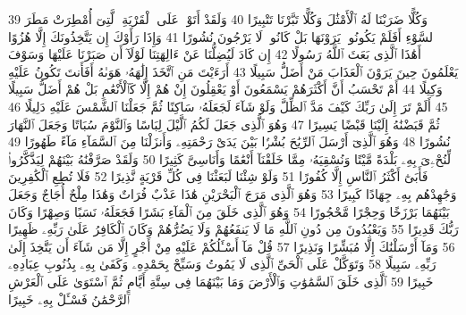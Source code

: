 {\tiny\colorbox{cl_aya}{39}} وَكُلًّا ضَرَبْنَا لَهُ ٱلْأَمْثَٰلَ وَكُلًّا تَبَّرْنَا تَتْبِيرًا
{\tiny\colorbox{cl_aya}{40}} وَلَقَدْ أَتَوْا۟ عَلَى ٱلْقَرْيَةِ ٱلَّتِىٓ أُمْطِرَتْ مَطَرَ ٱلسَّوْءِ أَفَلَمْ يَكُونُوا۟ يَرَوْنَهَا بَلْ كَانُوا۟ لَا يَرْجُونَ نُشُورًا
{\tiny\colorbox{cl_aya}{41}} وَإِذَا رَأَوْكَ إِن يَتَّخِذُونَكَ إِلَّا هُزُوًا أَهَٰذَا ٱلَّذِى بَعَثَ ٱللَّهُ رَسُولًا
{\tiny\colorbox{cl_aya}{42}} إِن كَادَ لَيُضِلُّنَا عَنْ ءَالِهَتِنَا لَوْلَآ أَن صَبَرْنَا عَلَيْهَا وَسَوْفَ يَعْلَمُونَ حِينَ يَرَوْنَ ٱلْعَذَابَ مَنْ أَضَلُّ سَبِيلًا
{\tiny\colorbox{cl_aya}{43}} أَرَءَيْتَ مَنِ ٱتَّخَذَ إِلَٰهَهُۥ هَوَىٰهُ أَفَأَنتَ تَكُونُ عَلَيْهِ وَكِيلًا
{\tiny\colorbox{cl_aya}{44}} أَمْ تَحْسَبُ أَنَّ أَكْثَرَهُمْ يَسْمَعُونَ أَوْ يَعْقِلُونَ إِنْ هُمْ إِلَّا كَٱلْأَنْعَٰمِ بَلْ هُمْ أَضَلُّ سَبِيلًا
{\tiny\colorbox{cl_aya}{45}} أَلَمْ تَرَ إِلَىٰ رَبِّكَ كَيْفَ مَدَّ ٱلظِّلَّ وَلَوْ شَآءَ لَجَعَلَهُۥ سَاكِنًا ثُمَّ جَعَلْنَا ٱلشَّمْسَ عَلَيْهِ دَلِيلًا
{\tiny\colorbox{cl_aya}{46}} ثُمَّ قَبَضْنَٰهُ إِلَيْنَا قَبْضًا يَسِيرًا
{\tiny\colorbox{cl_aya}{47}} وَهُوَ ٱلَّذِى جَعَلَ لَكُمُ ٱلَّيْلَ لِبَاسًا وَٱلنَّوْمَ سُبَاتًا وَجَعَلَ ٱلنَّهَارَ نُشُورًا
{\tiny\colorbox{cl_aya}{48}} وَهُوَ ٱلَّذِىٓ أَرْسَلَ ٱلرِّيَٰحَ بُشْرًۢا بَيْنَ يَدَىْ رَحْمَتِهِۦ وَأَنزَلْنَا مِنَ ٱلسَّمَآءِ مَآءً طَهُورًا
{\tiny\colorbox{cl_aya}{49}} لِّنُحْۦِىَ بِهِۦ بَلْدَةً مَّيْتًا وَنُسْقِيَهُۥ مِمَّا خَلَقْنَآ أَنْعَٰمًا وَأَنَاسِىَّ كَثِيرًا
{\tiny\colorbox{cl_aya}{50}} وَلَقَدْ صَرَّفْنَٰهُ بَيْنَهُمْ لِيَذَّكَّرُوا۟ فَأَبَىٰٓ أَكْثَرُ ٱلنَّاسِ إِلَّا كُفُورًا
{\tiny\colorbox{cl_aya}{51}} وَلَوْ شِئْنَا لَبَعَثْنَا فِى كُلِّ قَرْيَةٍ نَّذِيرًا
{\tiny\colorbox{cl_aya}{52}} فَلَا تُطِعِ ٱلْكَٰفِرِينَ وَجَٰهِدْهُم بِهِۦ جِهَادًا كَبِيرًا
{\tiny\colorbox{cl_aya}{53}} وَهُوَ ٱلَّذِى مَرَجَ ٱلْبَحْرَيْنِ هَٰذَا عَذْبٌ فُرَاتٌ وَهَٰذَا مِلْحٌ أُجَاجٌ وَجَعَلَ بَيْنَهُمَا بَرْزَخًا وَحِجْرًا مَّحْجُورًا
{\tiny\colorbox{cl_aya}{54}} وَهُوَ ٱلَّذِى خَلَقَ مِنَ ٱلْمَآءِ بَشَرًا فَجَعَلَهُۥ نَسَبًا وَصِهْرًا وَكَانَ رَبُّكَ قَدِيرًا
{\tiny\colorbox{cl_aya}{55}} وَيَعْبُدُونَ مِن دُونِ ٱللَّهِ مَا لَا يَنفَعُهُمْ وَلَا يَضُرُّهُمْ وَكَانَ ٱلْكَافِرُ عَلَىٰ رَبِّهِۦ ظَهِيرًا
{\tiny\colorbox{cl_aya}{56}} وَمَآ أَرْسَلْنَٰكَ إِلَّا مُبَشِّرًا وَنَذِيرًا
{\tiny\colorbox{cl_aya}{57}} قُلْ مَآ أَسْـَٔلُكُمْ عَلَيْهِ مِنْ أَجْرٍ إِلَّا مَن شَآءَ أَن يَتَّخِذَ إِلَىٰ رَبِّهِۦ سَبِيلًا
{\tiny\colorbox{cl_aya}{58}} وَتَوَكَّلْ عَلَى ٱلْحَىِّ ٱلَّذِى لَا يَمُوتُ وَسَبِّحْ بِحَمْدِهِۦ وَكَفَىٰ بِهِۦ بِذُنُوبِ عِبَادِهِۦ خَبِيرًا
{\tiny\colorbox{cl_aya}{59}} ٱلَّذِى خَلَقَ ٱلسَّمَٰوَٰتِ وَٱلْأَرْضَ وَمَا بَيْنَهُمَا فِى سِتَّةِ أَيَّامٍ ثُمَّ ٱسْتَوَىٰ عَلَى ٱلْعَرْشِ ٱلرَّحْمَٰنُ فَسْـَٔلْ بِهِۦ خَبِيرًا
